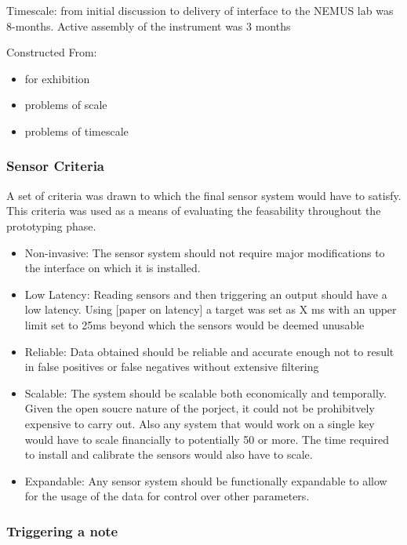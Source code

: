 Timescale: from initial discussion to delivery of interface to the NEMUS
lab was 8-months. Active assembly of the instrument was 3 months

Constructed From:

\begin{itemize}
\item
  for exhibition
\item
  problems of scale
\item
  problems of timescale
\end{itemize}

\subsubsection{Sensor Criteria}\label{sensor-criteria}

A set of criteria was drawn to which the final sensor system would have
to satisfy. This criteria was used as a means of evaluating the
feasability throughout the prototyping phase.

\begin{itemize}
\item
  Non-invasive: The sensor system should not require major modifications
  to the interface on which it is installed.
\item
  Low Latency: Reading sensors and then triggering an output should have
  a low latency. Using {[}paper on latency{]} a target was set as X ms
  with an upper limit set to 25ms beyond which the sensors would be
  deemed unusable
\item
  Reliable: Data obtained should be reliable and accurate enough not to
  result in false positives or false negatives without extensive
  filtering
\item
  Scalable: The system should be scalable both economically and
  temporally. Given the open soucre nature of the porject, it could not
  be prohibitvely expensive to carry out. Also any system that would
  work on a single key would have to scale financially to potentially 50
  or more. The time required to install and calibrate the sensors would
  also have to scale.
\item
  Expandable: Any sensor system should be functionally expandable to
  allow for the usage of the data for control over other parameters.
\end{itemize}

\subsubsection{Triggering a note}\label{triggering-a-note}

